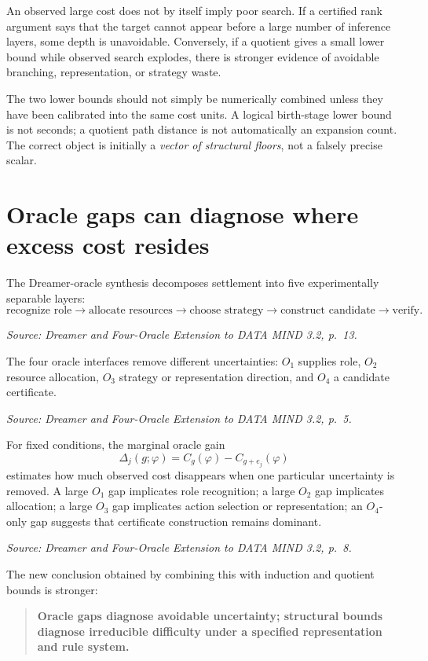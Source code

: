 \documentclass[11pt]{article}
\newcommand{\src}[1]{\par\smallskip\noindent\textit{Source: #1}\normalsize}
\begin{document}
An observed large cost does not by itself imply poor search. If a certified rank argument says that the target cannot appear before a large number of inference layers, some depth is unavoidable. Conversely, if a quotient gives a small lower bound while observed search explodes, there is stronger evidence of avoidable branching, representation, or strategy waste.

The two lower bounds should not simply be numerically combined unless they have been calibrated into the same cost units. A logical birth-stage lower bound is not seconds; a quotient path distance is not automatically an expansion count. The correct object is initially a \emph{vector of structural floors}, not a falsely precise scalar.

\section{Oracle gaps can diagnose where excess cost resides}

The Dreamer-oracle synthesis decomposes settlement into five experimentally separable layers:
\[
\text{recognize role}
\rightarrow
\text{allocate resources}
\rightarrow
\text{choose strategy}
\rightarrow
\text{construct candidate}
\rightarrow
\text{verify}.
\]
\src{\emph{Dreamer and Four-Oracle Extension to DATA MIND 3.2}, p.~13.}

The four oracle interfaces remove different uncertainties: $O_1$ supplies role, $O_2$ resource allocation, $O_3$ strategy or representation direction, and $O_4$ a candidate certificate.
\src{\emph{Dreamer and Four-Oracle Extension to DATA MIND 3.2}, p.~5.}

For fixed conditions, the marginal oracle gain
\[
\Delta_j(g;\varphi)=C_g(\varphi)-C_{g+e_j}(\varphi)
\]
estimates how much observed cost disappears when one particular uncertainty is removed. A large $O_1$ gap implicates role recognition; a large $O_2$ gap implicates allocation; a large $O_3$ gap implicates action selection or representation; an $O_4$-only gap suggests that certificate construction remains dominant.
\src{\emph{Dreamer and Four-Oracle Extension to DATA MIND 3.2}, p.~8.}

The new conclusion obtained by combining this with induction and quotient bounds is stronger:

\begin{quote}
\textbf{Oracle gaps diagnose avoidable uncertainty; structural bounds diagnose irreducible difficulty under a specified representation and rule system.}
\end{quote}
\end{document}

